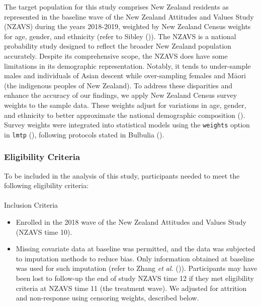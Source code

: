 \documentclass[
  single column]{article}
\makeatletter
\let\oldparagraph\paragraph
\renewcommand{\paragraph}{
    \@ifstar
      \xxxParagraphStar
      \xxxParagraphNoStar
  }
\newcommand{\xxxParagraphStar}[1]{\oldparagraph*{#1}\mbox{}}
\newcommand{\xxxParagraphNoStar}[1]{\oldparagraph{#1}\mbox{}}
\providecommand{\tightlist}{%
  \setlength{\itemsep}{0pt}\setlength{\parskip}{0pt}}\usepackage{longtable,booktabs,array}
\makeatother
\begin{document}
The target population for this study comprises New Zealand residents as
represented in the baseline wave of the New Zealand Attitudes and Values
Study (NZAVS) during the years 2018-2019, weighted by New Zealand Census
weights for age, gender, and ethnicity (refer to Sibley
()). The NZAVS is a national probability
study designed to reflect the broader New Zealand population accurately.
Despite its comprehensive scope, the NZAVS does have some limitations in
its demographic representation. Notably, it tends to under-sample males
and individuals of Asian descent while over-sampling females and Māori
(the indigenous peoples of New Zealand). To address these disparities
and enhance the accuracy of our findings, we apply New Zealand Census
survey weights to the sample data. These weights adjust for variations
in age, gender, and ethnicity to better approximate the national
demographic composition (). Survey
weights were integrated into statistical models using the
\texttt{weights} option in \texttt{lmtp}
(), following
protocols stated in Bulbulia
().

\subsubsection{Eligibility Criteria}\label{eligibility-criteria}

To be included in the analysis of this study, participants needed to
meet the following eligibility criteria:

\paragraph{Inclusion Criteria}\label{inclusion-criteria}

\begin{itemize}
\tightlist
\item
  Enrolled in the 2018 wave of the New Zealand Attitudes and Values
  Study (NZAVS time 10).
\item
  Missing covariate data at baseline was permitted, and the data was
  subjected to imputation methods to reduce bias. Only information
  obtained at baseline was used for such imputation (refer to Zhang
  \emph{et al.}
  ()).
  Participants may have been lost to follow-up the end of study NZAVS
  time 12 if they met eligibility criteria at NZAVS time 11 (the
  treatment wave). We adjusted for attrition and non-response using
  censoring weights, described below.
\end{itemize}
\end{document}
